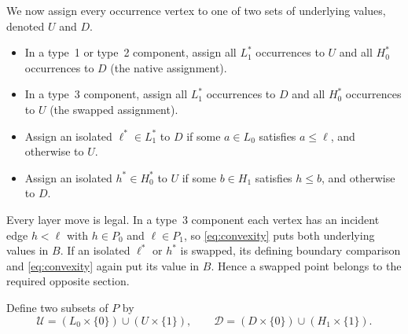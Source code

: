 \documentclass[11pt]{article}
\newcommand{\cD}{\mathcal D}
\newcommand{\cU}{\mathcal U}
\begin{document}
We now assign every occurrence vertex to one of two sets of underlying
values, denoted $U$ and $D$.
\begin{itemize}
\item In a type~1 or type~2 component, assign all $L_1^*$ occurrences to
  $U$ and all $H_0^*$ occurrences to $D$ (the native assignment).
\item In a type~3 component, assign all $L_1^*$ occurrences to $D$ and all
  $H_0^*$ occurrences to $U$ (the swapped assignment).
\item Assign an isolated $\ell^*\in L_1^*$ to $D$ if some $a\in L_0$
  satisfies $a\leq\ell$, and otherwise to $U$.
\item Assign an isolated $h^*\in H_0^*$ to $U$ if some $b\in H_1$
  satisfies $h\leq b$, and otherwise to $D$.
\end{itemize}

Every layer move is legal.  In a type~3 component each vertex has an
incident edge $h<\ell$ with $h\in P_0$ and $\ell\in P_1$, so
\eqref{eq:convexity} puts both underlying values in $B$.  If an isolated
$\ell^*$ or $h^*$ is swapped, its defining boundary comparison and
\eqref{eq:convexity} again put its value in $B$.  Hence a swapped point
belongs to the required opposite section.

Define two subsets of $P$ by
\begin{equation}\label{eq:outputs}
 \cU=(L_0\times\{0\})\cup(U\times\{1\}),
 \qquad
 \cD=(D\times\{0\})\cup(H_1\times\{1\}).
\end{equation}
\end{document}
